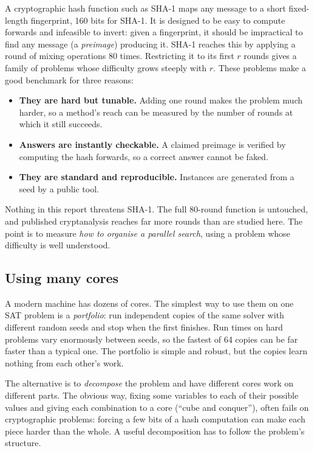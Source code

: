 \documentclass[11pt,a4paper]{article}
\begin{document}
A cryptographic hash function such as SHA-1 maps any message to a short fixed-length fingerprint,
160 bits for SHA-1. It is designed to be easy to compute forwards and infeasible to invert: given a
fingerprint, it should be impractical to find any message (a \emph{preimage}) producing it. SHA-1
reaches this by applying a round of mixing operations 80 times. Restricting it to its first $r$ rounds
gives a family of problems whose difficulty grows steeply with $r$. These problems make a good
benchmark for three reasons:
\begin{itemize}
\item \textbf{They are hard but tunable.} Adding one round makes the problem much harder, so a method's
reach can be measured by the number of rounds at which it still succeeds.
\item \textbf{Answers are instantly checkable.} A claimed preimage is verified by computing the hash
forwards, so a correct answer cannot be faked.
\item \textbf{They are standard and reproducible.} Instances are generated from a seed by a public tool.
\end{itemize}
Nothing in this report threatens SHA-1. The full 80-round function is untouched, and published
cryptanalysis reaches far more rounds than are studied here. The point is to measure \emph{how to
organise a parallel search}, using a problem whose difficulty is well understood.

\subsection{Using many cores}

A modern machine has dozens of cores. The simplest way to use them on one SAT problem is a
\emph{portfolio}: run independent copies of the same solver with different random seeds and stop
when the first finishes. Run times on hard problems vary enormously between seeds, so the fastest of
64 copies can be far faster than a typical one. The portfolio is simple and robust, but the copies
learn nothing from each other's work.

The alternative is to \emph{decompose} the problem and have different cores work on different
parts. The obvious way, fixing some variables to each of their possible values and giving each
combination to a core (``cube and conquer''), often fails on cryptographic problems: forcing a few
bits of a hash computation can make each piece harder than the whole. A useful decomposition has to
follow the problem's structure.
\end{document}
